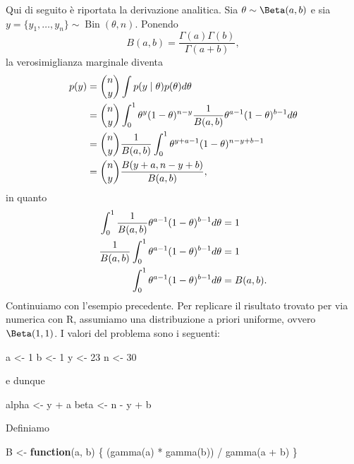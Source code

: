 \documentclass[
  11pt,
  italian,
  a4paper,
  extrafontsizes,onecolumn,openright
  ]{memoir}
\newenvironment{Shaded}{\begin{snugshade}}{\end{snugshade}}
\newcommand{\ControlFlowTok}[1]{\textcolor[rgb]{0.13,0.29,0.53}{\textbf{#1}}}
\newcommand{\DecValTok}[1]{\textcolor[rgb]{0.00,0.00,0.81}{#1}}
\newcommand{\FunctionTok}[1]{\textcolor[rgb]{0.00,0.00,0.00}{#1}}
\newcommand{\NormalTok}[1]{#1}
\newcommand{\OtherTok}[1]{\textcolor[rgb]{0.56,0.35,0.01}{#1}}
\newcommand{\SpecialCharTok}[1]{\textcolor[rgb]{0.00,0.00,0.00}{#1}}
\DeclareMathOperator{\Bin}{Bin} %
\newcommand{\R}{\textsf{R}} %
\begin{document}
Qui di seguito è riportata la derivazione analitica. Sia \(\theta \sim \Beta(a, b)\) e sia \(y = \{y_1, \dots, y_n\} \sim \Bin(\theta, n)\). Ponendo
\[
B(a, b) = \frac{\Gamma(a)\Gamma(b)}{\Gamma(a+b)},
\]
\noindent
la verosimiglianza marginale diventa
\begin{align}
p(y) &= \binom{n}{y} \int p(y \mid \theta) p(\theta) d\theta \notag\\
&= \binom{n}{y}\int_0^1 \theta^{y} (1 - \theta)^{n- y} \frac{1}{B(a,b)} \theta^{a-1} (1-\theta)^{b-1} d \theta \notag\\
&= \binom{n}{y}\frac{1}{B(a,b)} \int_0^1 \theta^{y + a - 1} (1-\theta)^{n- y + b-1} \notag\\
&= \binom{n}{y}\frac{B(y + a, n- y + b)}{B(a,b)},
\end{align}
\noindent
in quanto
\begin{align}
\int_0^1 \frac{1}{B(a,b)} \theta^{a-1} (1-\theta)^{b-1} d \theta &= 1\notag\\
\frac{1}{B(a,b)} \int_0^1  \theta^{a-1} (1-\theta)^{b-1} d \theta &= 1\notag\\
\int_0^1  \theta^{a-1} (1-\theta)^{b-1} d \theta &= B(a,b). \notag
\end{align}
\noindent
Continuiamo con l'esempio precedente. Per replicare il risultato trovato per via numerica con \R, assumiamo una distribuzione a priori uniforme, ovvero \(\Beta(1, 1)\). I valori del problema sono i seguenti:

\begin{Shaded}
\begin{Highlighting}[]
\NormalTok{a }\OtherTok{\textless{}{-}} \DecValTok{1}
\NormalTok{b }\OtherTok{\textless{}{-}} \DecValTok{1}
\NormalTok{y }\OtherTok{\textless{}{-}} \DecValTok{23}
\NormalTok{n }\OtherTok{\textless{}{-}} \DecValTok{30}
\end{Highlighting}
\end{Shaded}

\noindent
e dunque

\begin{Shaded}
\begin{Highlighting}[]
\NormalTok{alpha }\OtherTok{\textless{}{-}}\NormalTok{ y }\SpecialCharTok{+}\NormalTok{ a}
\NormalTok{beta }\OtherTok{\textless{}{-}}\NormalTok{ n }\SpecialCharTok{{-}}\NormalTok{ y }\SpecialCharTok{+}\NormalTok{ b}
\end{Highlighting}
\end{Shaded}

\noindent
Definiamo

\begin{Shaded}
\begin{Highlighting}[]
\NormalTok{B }\OtherTok{\textless{}{-}} \ControlFlowTok{function}\NormalTok{(a, b) \{}
\NormalTok{  (}\FunctionTok{gamma}\NormalTok{(a) }\SpecialCharTok{*} \FunctionTok{gamma}\NormalTok{(b)) }\SpecialCharTok{/} \FunctionTok{gamma}\NormalTok{(a }\SpecialCharTok{+}\NormalTok{ b)}
\NormalTok{\}}
\end{Highlighting}
\end{Shaded}
\end{document}
